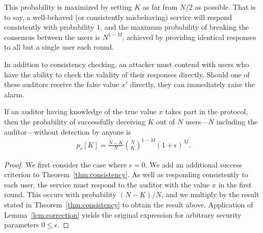 \documentclass[USenglish]{llncs}
\begin{document}
This probability is maximized by setting $K$ as far from $N/2$ as
possible.  That is to say, a well-behaved (or consistently misbehaving)
service will respond consistently with probability $1$, and the maximum probability
of breaking the consensus between the users is $N^{1-M}$, achieved by providing identical
responses to all but a single user each round.

In addition to consistency checking, an attacker must contend with users
who have the ability to check the validity of their responses directly.  Should one
of these auditors receive the false value $x'$ directly, they can immediately
raise the alarm.

\begin{corollary}\label{cor:auditor}
If an auditor having knowledge of the true value $x$ takes part in the protocol,
then the probability of successfully
deceiving $K$ out of $N$
users---$N$ including the auditor---without detection by anyone is
\begin{align}
p_s[K] = \frac{N-K}{N}{N \choose K}^{1-M} (1+\epsilon)^M .
\end{align}
\begin{proof}
	We first consider the case where $\epsilon = 0$.
	We add an additional success criterion to Theorem~\ref{thm:consistency}.
	As well as responding consistently to each user, the service must respond to
	the auditor with the value $x$ in the first round.
	This occurs with probability $(N-K)/N$, and
	we multiply by the result stated in Theorem~\ref{thm:consistency}
	to obtain the result above.
	Application of Lemma~\ref{lem:correction} yields the original expression for
arbitrary security parameters $0 \le \epsilon$.
\end{proof}
\end{corollary}
\end{document}
